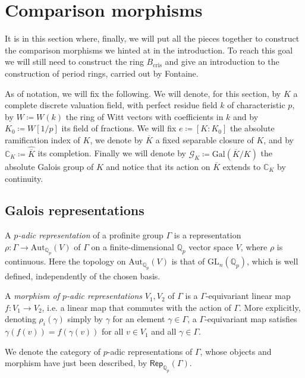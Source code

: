 \section{Comparison morphisms}
It is in this section where, finally, we will put all the pieces together to construct
the comparison morphisms we hinted at in the introduction.
To reach this goal we will still need to construct the ring $B_{\mathrm{cris}}$
and give an introduction to the construction of period rings, carried out by Fontaine.

As of notation, we will fix the following.
We will denote, for this section, by $K$ a complete discrete valuation field, 
with perfect residue field $k$ of characteristic $p$,
by $W \coloneqq W(k)$ the ring of Witt vectors with coefficients in $k$
and by $K_0 \coloneqq W[1/p]$ its field of fractions.
We will fix $e \coloneqq [ K : K_0 ]$ the absolute ramification index of $K$,
we denote by $\overline{K}$ a fixed separable closure of $K$,
and by $\mathbb{C}_K \coloneqq \widehat{\overline{K}}$ its completion.
Finally we will denote by $\mathscr{G}_K \coloneqq \mathrm{Gal}\left( \overline{K} / K \right)$ 
the absolute Galois group of $K$ and notice that its action on $\overline{K}$
extends to $\mathbb{C}_K$ by continuity.



\subsection{Galois representations}
\begin{defn}
	A {\em $p$-adic representation} of a profinite group $\Gamma$ is a
	representation $\rho\colon \Gamma \to \mathrm{Aut}_{\mathbb{Q}_p}(V)$
	of $\Gamma$ on a finite-dimensional $\mathbb{Q}_p$ vector space
	$V$, where $\rho$ is continuous.
	Here the topology on $\mathrm{Aut}_{\mathbb{Q}_p}(V)$ is
	that of $\mathrm{GL}_n(\mathbb{Q}_p)$, which is well defined,
	independently of the chosen basis.

	A {\em morphism of $p$-adic representations} $V_1, V_2$ of $\Gamma$
	is a $\Gamma$-equivariant linear map $f\colon V_1 \to V_2$, 
	i.e. a linear map that commutes with the action of $\Gamma$.
	More explicitly, denoting $\rho_i(\gamma)$ simply by $\gamma$ for
	an element $\gamma \in \Gamma$, a $\Gamma$-equivariant
	map satisfies $\gamma(f(v)) = f(\gamma(v))$
	for all $v \in V_1$ and all $\gamma \in \Gamma$.

	We denote the category of $p$-adic representations of $\Gamma$,
	whose objects and morphism have just been described,
	by $\mathsf{Rep}_{\mathbb{Q}_p}(\Gamma)$.
\end{defn}


